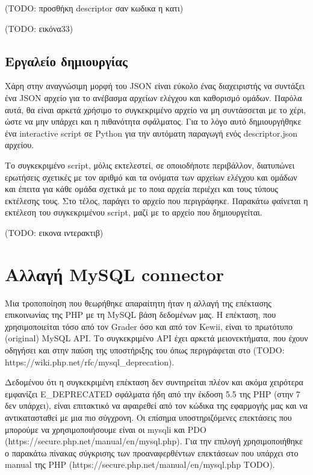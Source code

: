 \documentclass[diploma]{softlab-thesis}
\begin{document}
(TODO: προσθήκη descriptor σαν κωδικα η κατι)

(TODO: εικόνα33)

\subsection{Εργαλείο δημιουργίας}

Χάρη στην αναγνώσιμη μορφή του JSON είναι εύκολο ένας διαχειριστής να συντάξει
ένα JSON αρχείο για το ανέβασμα αρχείων ελέγχου και καθορισμό ομάδων. Παρόλα
αυτά, θα είναι αρκετά χρήσιμο το συγκεκριμένο αρχείο να μη συντάσσεται με το
χέρι, ώστε να μην υπάρχει και η πιθανότητα σφάλματος. Για το λόγο αυτό
δημιουργήθηκε ένα interactive script σε Python για την αυτόματη παραγωγή ενός
descriptor.json αρχείου.

\bigskip

Το συγκεκριμένο script, μόλις εκτελεστεί, σε οποιοδήποτε περιβάλλον, διατυπώνει
ερωτήσεις σχετικές με τον αριθμό και τα ονόματα των αρχείων ελέγχου και ομάδων
και έπειτα για κάθε ομάδα σχετικά με το ποια αρχεία περιέχει και τους τύπους
εκτέλεσης τους. Στο τέλος, παράγει το αρχείο που περιγράφηκε. Παρακάτω φαίνεται
η εκτέλεση του συγκεκριμένου script, μαζί με το αρχείο που δημιουργείται.


(TODO:  εικονα ιντερακτιβ)

\section{Αλλαγή MySQL connector}

Μια τροποποίηση που θεωρήθηκε απαραίτητη ήταν η αλλαγή της επέκτασης
επικοινωνίας της PHP με τη MySQL βάση δεδομένων μας. Η επέκταση, που
χρησιμοποιείται τόσο από τον Grader όσο και από τον Kewii, είναι το πρωτότυπο
(original) MySQL API. Το συγκεκριμένο API έχει αρκετά μειονεκτήματα, που έχουν
οδηγήσει και στην παύση της υποστήριξης του όπως περιγράφεται στο (TODO:
https://wiki.php.net/rfc/mysql\_deprecation).

\bigskip

Δεδομένου ότι η συγκεκριμένη επέκταση δεν συντηρείται πλέον και ακόμα χειρότερα
εμφανίζει E\_DEPRECATED σφάλματα ήδη από την έκδοση 5.5 της PHP (στην 7 δεν
υπάρχει), είναι επιτακτικό να αφαιρεθεί από τον κώδικα της εφαρμογής μας και να
αντικατασταθεί με μια πιο σύγχρονη. Οι επίσημα υποστηριζόμενες επεκτάσεις που
μπορούμε να χρησιμοποιήσουμε είναι οι mysqli και PDO
(https://secure.php.net/manual/en/mysql.php). Για την επιλογή χρησιμοποιήθηκε ο
παρακάτω πίνακας σύγκρισης των προαναφερθέντων επεκτάσεων που υπάρχει στο
manual της PHP (https://secure.php.net/manual/en/mysql.php TODO).
\end{document}
